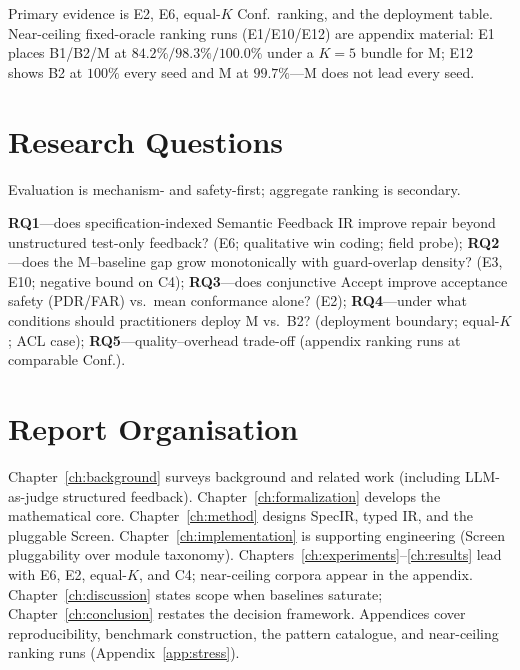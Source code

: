 Primary evidence is E2, E6, equal-$K$ Conf.\ ranking, and the deployment table.
Near-ceiling fixed-oracle ranking runs (E1/E10/E12) are appendix material:
E1 places B1/B2/M at $84.2\%/98.3\%/100.0\%$ under a $K{=}5$ bundle for M;
E12 shows B2 at $100\%$ every seed and M at $99.7\%$---M does not lead every
seed.


\section{Research Questions}
\label{sec:intro:rq}

Evaluation is mechanism- and safety-first; aggregate ranking is secondary.

\textbf{RQ1}---does specification-indexed Semantic Feedback IR improve repair
beyond unstructured test-only feedback? (E6; qualitative win coding; field
probe);
\textbf{RQ2}---does the M--baseline gap grow monotonically with guard-overlap
density? (E3, E10; negative bound on C4);
\textbf{RQ3}---does conjunctive $\mathrm{Accept}$ improve acceptance safety
(PDR/FAR) vs.\ mean conformance alone? (E2);
\textbf{RQ4}---under what conditions should practitioners deploy M vs.\ B2?
(deployment boundary; equal-$K$; ACL case);
\textbf{RQ5}---quality--overhead trade-off (appendix ranking runs at
comparable Conf.).


\section{Report Organisation}
\label{sec:intro:organisation}

Chapter~\ref{ch:background} surveys background and related work (including
LLM-as-judge structured feedback).
Chapter~\ref{ch:formalization} develops the mathematical core.
Chapter~\ref{ch:method} designs SpecIR, typed IR, and the pluggable Screen.
Chapter~\ref{ch:implementation} is supporting engineering (Screen
pluggability over module taxonomy).
Chapters~\ref{ch:experiments}--\ref{ch:results} lead with E6, E2, equal-$K$,
and C4; near-ceiling corpora appear in the appendix.
Chapter~\ref{ch:discussion} states scope when baselines saturate;
Chapter~\ref{ch:conclusion} restates the decision framework.
Appendices cover reproducibility, benchmark construction, the pattern
catalogue, and near-ceiling ranking runs (Appendix~\ref{app:stress}).
